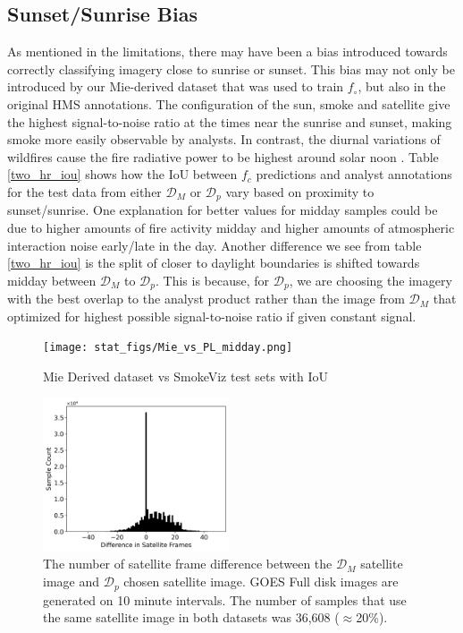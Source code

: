 \documentclass{article}
\begin{document}
\subsection{Sunset/Sunrise Bias}

As mentioned in the limitations, there may have been a bias introduced towards correctly classifying imagery close to sunrise or sunset. This bias may not only be introduced by our Mie-derived dataset that was used to train \(f_{\circ}\), but also in the original HMS annotations. The configuration of the sun, smoke and satellite give the highest signal-to-noise ratio at the times near the sunrise and sunset, making smoke more easily observable by analysts. In contrast, the diurnal variations of wildfires cause the fire radiative power to be highest around solar noon \cite{diurnal}. Table \ref{two_hr_iou} shows how the IoU between \(f_c\) predictions and analyst annotations for the test data from either \(\mathcal{D}_M\) or \(\mathcal{D}_p\) vary based on proximity to sunset/sunrise. One explanation for better values for midday samples could be due to higher amounts of fire activity midday and higher amounts of atmospheric interaction noise early/late in the day. Another difference we see from table \ref{two_hr_iou} is the split of closer to daylight boundaries is shifted towards midday between \(\mathcal{D}_M\) to \(\mathcal{D}_p\). This is because, for \(\mathcal{D}_p\), we are choosing the imagery with the best overlap to the analyst product rather than the image from \(\mathcal{D}_M\) that optimized for highest possible signal-to-noise ratio if given constant signal.

\begin{figure}[!htb]
    \centering
    \texttt{[image: stat\_figs/Mie\_vs\_PL\_midday.png]}
    \caption{Mie Derived dataset vs SmokeViz test sets with IoU}
    \label{DM_vs_DP}
\end{figure}

\begin{figure}[!htb]
    \centering
        \includegraphics[width=0.49\textwidth]{stat_figs/sample_count_vs_diff_frames.png}
        \caption{The number of satellite frame difference between the \(\mathcal{D}_M\) satellite image and \(\mathcal{D}_p\) chosen satellite image. GOES Full disk images are generated on 10 minute intervals. The number of samples that use the same satellite image in both datasets was 36,608 (\(\approx\)20\%).}
        \label{frame_diff}
\end{figure}
\end{document}
